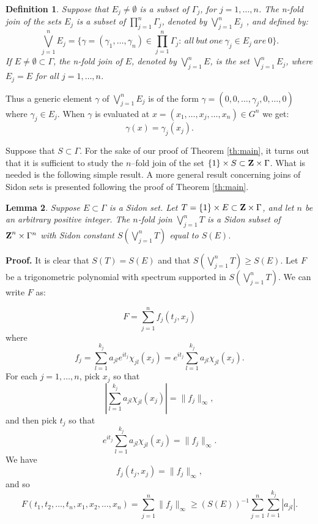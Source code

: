 \newtheorem{join}{Definition}[section]
\begin{join}
Suppose that $E_j\neq \emptyset$ is a subset of $\Gamma_j$, for $j = 1,
\ldots , n$.  The n-fold join of the sets $E_j$ is a subset of
$\prod_{j=1}^{n}\Gamma_j$, denoted by $\bigvee\limits^n_{j=1}E_j$ , and
defined by:
$$
\bigvee ^n_{j=1}E_j= \{ \gamma = (\gamma_1,\ldots , \gamma_n)
\in \prod_{j=1}^n\Gamma_j : \ all\  but\  one\  \gamma_j \in E_j\ are\
0\}
.
$$
If $E\neq\emptyset\subset\Gamma$, the n-fold join of $E$, denoted by
$\bigvee_{j=1}^nE$, is the set $\bigvee_{j=1}^nE_j$, where $E_j=E$ for
all $j=1, \ldots , n$.

\label{def:join}
\end{join}

Thus a generic element $\gamma$ of $\bigvee_{j=1}^nE_j$ is of the form
$\gamma = (0, 0, \ldots , \gamma_j , 0, \ldots , 0)$ where $\gamma_j \in
E_j$.  When $\gamma$ is evaluated at $x=(x_1, \ldots , x_j, \ldots , x_n)
\in G^n$ we get:
$$\gamma (x) = \gamma_j (x_j).$$

Suppose that $S\subset\Gamma$.  For the sake of our proof of Theorem
\ref{th:main},
it turns out that it is sufficient to study the $n$--fold join of the
set $\{1\}\times S\subset {\hbox{\bf Z}}\times\Gamma$.  What is needed is the
following simple result.  A more general result concerning joins of Sidon
sets is presented following the proof of Theorem \ref{th:main}.


\newtheorem{lem:sid1}[join]{Lemma}
\begin{lem:sid1}
Suppose $E\subset\Gamma$ is a Sidon set.  Let $T=\{1\}\times
E\subset{\hbox{\bf Z}}\times\Gamma$, and let $n$ be an arbitrary positive integer.
The $n$-fold join $\bigvee_{j=1}^n T$ is a Sidon subset of
${\hbox{\bf Z}}^n\times\Gamma^n$ with Sidon constant
$S\left(\bigvee_{j=1}^n T\right)$ equal to $S(E)$.

\label{lem:sid1}
\end{lem:sid1}

\def\scj{$S\left(\bigvee_{j=1}^n T\right)$}
\def\sidon{$\bigvee_{j=1}^n T$}


{\bf Proof.}  It is clear that $S(T)=S(E)$ and that \scj $\geq S(E)$.
Let
$F$ be a trigonometric polynomial with spectrum supported in \scj .
We can write $F$ as:

$$F =\sum_{j=1}^n f_j(t_j,x_j)$$
where
$$ f_j=\sum_{l=1}^{k_j}a_{jl}e^{it_j}\chi_{jl}(x_j)=
 e^{it_j} \sum_{l=1}^{k_j}a_{jl}\chi_{jl}(x_j). $$
For each $j=1,\ldots,n$, pick $x_j$ so that
$$ \left|\sum_{l=1}^{k_j}a_{jl}\chi_{jl}(x_j)\right|=\|f_j\|_\infty,$$
and then pick $t_j$ so that
 $$e^{it_j} \sum_{l=1}^{k_j}a_{jl}\chi_{jl}(x_j)=\|f_j\|_\infty .$$
We have
$$ f_j(t_j,x_j) = \|f_j\|_\infty ,$$
and so
$$F(t_1, t_2, \ldots, t_n, x_1, x_2, \ldots , x_n)=
\sum_{j=1}^n\|f_j\|_\infty\geq\left(S(E)\right)^{-1}
\sum_{j=1}^n\sum_{l=1}^{k_j}|a_{jl}|.$$

